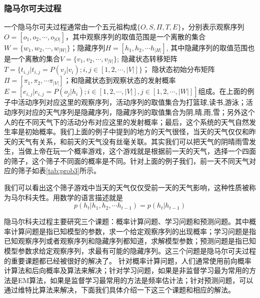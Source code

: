 \documentclass[twoside,a4paper,12pt]{book}%
\begin{document}
\subsubsection{隐马尔可夫过程}
一个隐马尔可夫过程通常由一个五元祖构成$\{O,S,\Pi,T,E\}$，分别表示观察序列$O=[o_1,o_2,\cdots,o_{|O|}]$，其中观察序列的取值范围是一个离散的集合$W=\{w_1, w_2,\cdots,w_{|W|}\}$；隐藏序列$H=[h_1,h_2, \cdots h_{|H|}]$, 其中隐藏序列的取值范围也是一个离散的集合$V=\{v_1,v_2,\cdots,v_{|V|}\}$; 隐藏状态转移矩阵$T=\{t_{i,j}|t_{i,j}=P(v_j|v_i); i,j \in [1,2,\cdots,|V|]\}$； 隐状态初始分布矩阵$\Pi=[\pi_1,\pi_2,\cdots \pi_{|V|}]$；和隐藏状态到观察状态的发射概率$E=[e_{i,j} | e_{i,j}=P(o_j|h_i);i\in[1,2,\cdots,|V|],j\in[1,2,\cdots,|W|]]$组成。在上面的例子中活动序列对应这里的观察序列，活动序列的取值集合为{打篮球,读书,游泳}；活动序列对应的天气序列是隐藏序列，隐藏序列的取值集合为{阴,晴,雨,雪}；另外这个人的在不同天气下的活动分布对应这里的发射概率；最后，这个系统的天气自然发生率是初始概率。我们上面的例子中提到的地方的天气很怪，当天的天气仅仅和昨天的天气有关系，和前天的天气没有丝毫关联。其实我们可以把天气的阴晴雨雪发生，当做上帝在玩一个概率游戏，这个游戏就是根据前一天的天气，选择一个四面的筛子，这个筛子不同面的概率是不同。针对上面的例子我们，前一天不同天气对应的筛子如表\ref{tab:prob3}所示。
\begin{table} [h]
    \caption{天气筛子游戏}
	\label{tab:prob3}
	\centering
\end{table}  
我们可以看出这个筛子游戏中当天的天气仅仅受前一天的天气影响，这种性质被称为马尔科夫性。用数学的语言描述就是
$$
p(h_t|h_1,h_2, \cdots h_{t-1}) = p(h_t|h_{t-1})
$$

隐马尔科夫过程主要研究三个课题：概率计算问题、学习问题和预测问题。其中概率计算问题是指已知模型的参数，求一个给定观察序列的出现概率；学习问题是指已知观察序列或者观察序列和隐藏序列都知道，求解模型参数；预测问题是指已知模型参数求给定观察序列，求最有可能的隐藏序列。这三个问题是隐马尔可夫过程的重要课题都已经被很好的解决了。
针对概率计算问题，人们通常使用前向概率计算法和后向概率及算法来解决；针对学习问题，如果是非监督学习最为常用的方法是EM算法，如果是监督学习最常用的方法是频率估计法；针对预测问题，可以通过维特比算法来解决，下面我们具体介绍一下这三个课题和相应的解法。
\end{document}
